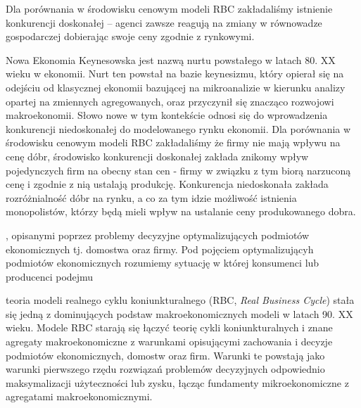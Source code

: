 

Dla porównania w środowisku cenowym modeli RBC zakładaliśmy istnienie konkurencji doskonałej -- agenci zawsze reagują na zmiany w równowadze gospodarczej dobierając swoje ceny zgodnie z rynkowymi. 

Nowa Ekonomia Keynesowska jest nazwą nurtu powstałego w latach 80. XX wieku w ekonomii. Nurt ten powstał na bazie keynesizmu, który opierał się na odejściu od klasycznej ekonomii bazującej na mikroanalizie w kierunku analizy opartej na zmiennych agregowanych, oraz przyczynił się znacząco rozwojowi makroekonomii. 
Słowo nowe w tym kontekście odnosi się do wprowadzenia konkurencji niedoskonałej do modelowanego rynku ekonomii. Dla porównania w środowisku cenowym modeli RBC zakładaliśmy że firmy nie mają wpływu na cenę dóbr, środowisko konkurencji doskonałej zakłada znikomy wpływ pojedynczych firm na obecny stan cen - firmy w związku z tym biorą narzuconą cenę i zgodnie z nią ustalają produkcję. Konkurencja niedoskonała zakłada rozróżnialność dóbr na rynku, a co za tym idzie możliwość istnienia monopolistów, którzy będą mieli wpływ na ustalanie ceny produkowanego dobra.

, opisanymi poprzez problemy decyzyjne optymalizujących podmiotów ekonomicznych tj. domostwa oraz firmy\cite{the_abc_of_rbcs}. Pod pojęciem optymalizującyh podmiotów ekonomicznych rozumiemy sytuację w której konsumenci lub producenci podejmu




teoria modeli realnego cyklu koniunkturalnego (RBC, \emph{Real Business Cycle})  stała się jedną z dominujących podstaw makroekonomicznych modeli w latach 90. XX wieku. Modele RBC starają się łączyć teorię cykli koniunkturalnych i znane agregaty makroekonomiczne z warunkami opisującymi zachowania i decyzje podmiotów ekonomicznych, domostw oraz firm. Warunki te powstają jako warunki pierwszego rzędu rozwiązań problemów decyzyjnych odpowiednio maksymalizacji użyteczności lub zysku, łącząc fundamenty mikroekonomiczne z agregatami makroekonomicznymi. 



